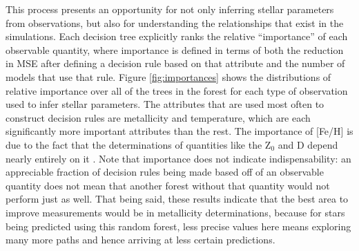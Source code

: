 \documentclass[manuscript,linenumbers]{aastex6}
\begin{document}
This process presents an opportunity for not only inferring stellar parameters from observations, but also for understanding the relationships that exist in the simulations. Each decision tree explicitly ranks the relative ``importance'' of each observable quantity, where importance is defined in terms of both the reduction in MSE after defining a decision rule based on that attribute and the number of models that use that rule. Figure \ref{fig:importances} shows the distributions of relative importance over all of the trees in the forest for each type of observation used to infer stellar parameters. The attributes that are used most often to construct decision rules are metallicity and temperature, which are each significantly more important attributes than the rest. The importance of [Fe/H] is due to the fact that the determinations of quantities like the Z$_0$ and D depend nearly entirely on it \citep[see also][]{main-sequence-stats}. %
Note that importance does not indicate indispensability: an appreciable fraction of decision rules being made based off of an observable quantity does not mean that another forest without that quantity would not perform just as well. That being said, these results indicate that the best area to improve measurements would be in metallicity determinations, because for stars being predicted using this random forest, less precise values here means exploring many more paths and hence arriving at less certain predictions. %
\end{document}
